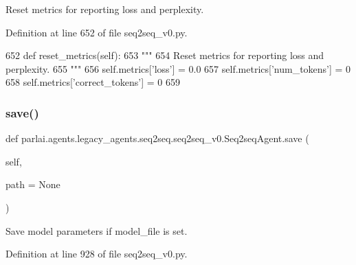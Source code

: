 \begin{DoxyVerb}Reset metrics for reporting loss and perplexity.
\end{DoxyVerb}
 

Definition at line 652 of file seq2seq\+\_\+v0.\+py.


\begin{DoxyCode}
652     \textcolor{keyword}{def }reset\_metrics(self):
653         \textcolor{stringliteral}{"""}
654 \textcolor{stringliteral}{        Reset metrics for reporting loss and perplexity.}
655 \textcolor{stringliteral}{        """}
656         self.metrics[\textcolor{stringliteral}{'loss'}] = 0.0
657         self.metrics[\textcolor{stringliteral}{'num\_tokens'}] = 0
658         self.metrics[\textcolor{stringliteral}{'correct\_tokens'}] = 0
659 
\end{DoxyCode}
\mbox{\label{classparlai_1_1agents_1_1legacy__agents_1_1seq2seq_1_1seq2seq__v0_1_1Seq2seqAgent_a31c017cd07b01834a5d467fadfddd7cd}} 
\subsubsection{\texorpdfstring{save()}{save()}}
{\footnotesize\ttfamily def parlai.\+agents.\+legacy\+\_\+agents.\+seq2seq.\+seq2seq\+\_\+v0.\+Seq2seq\+Agent.\+save (\begin{DoxyParamCaption}\item[{}]{self,  }\item[{}]{path = {\ttfamily None} }\end{DoxyParamCaption})}

\begin{DoxyVerb}Save model parameters if model_file is set.
\end{DoxyVerb}
 

Definition at line 928 of file seq2seq\+\_\+v0.\+py.


